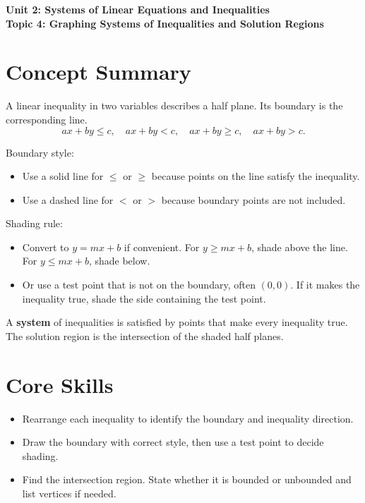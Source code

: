 \documentclass[12pt]{article}
\begin{document}
\begin{center}
    \LARGE \textbf{Unit 2: Systems of Linear Equations and Inequalities} \\[6pt]
    \Large \textbf{Topic 4: Graphing Systems of Inequalities and Solution Regions}
\end{center}

\vspace{1em}

\section*{Concept Summary}

A linear inequality in two variables describes a half plane. Its boundary is the corresponding line.  
\[
ax + by \le c,\quad ax + by < c,\quad ax + by \ge c,\quad ax + by > c.
\]

Boundary style:
\begin{itemize}
    \item Use a solid line for \(\le\) or \(\ge\) because points on the line satisfy the inequality.
    \item Use a dashed line for \(<\) or \(>\) because boundary points are not included.
\end{itemize}

Shading rule:
\begin{itemize}
    \item Convert to \(y = mx + b\) if convenient. For \(y \ge mx + b\), shade above the line. For \(y \le mx + b\), shade below.
    \item Or use a test point that is not on the boundary, often \((0,0)\). If it makes the inequality true, shade the side containing the test point.
\end{itemize}

A \textbf{system} of inequalities is satisfied by points that make every inequality true. The solution region is the intersection of the shaded half planes.

\section*{Core Skills}
\begin{itemize}
    \item Rearrange each inequality to identify the boundary and inequality direction.
    \item Draw the boundary with correct style, then use a test point to decide shading.
    \item Find the intersection region. State whether it is bounded or unbounded and list vertices if needed.
\end{itemize}
\end{document}
